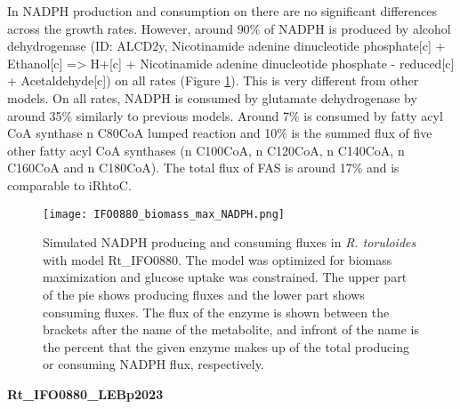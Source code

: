 In NADPH production and consumption on there are no significant differences across the growth rates. However, around $90\%$ of NADPH is produced by alcohol dehydrogenase (ID: ALCD2y, Nicotinamide adenine dinucleotide phosphate[c] + Ethanol[c] => H+[c] + Nicotinamide adenine dinucleotide phosphate - reduced[c] + Acetaldehyde[c]) on all rates (Figure \ref{fig:IFO0880_biomass_max_NADPH_max}). This is very different from other models. 
On all rates, NADPH is consumed by glutamate dehydrogenase by around 35\% similarly to previous models. Around 7\% is consumed by fatty acyl CoA synthase n C80CoA lumped reaction and 10\% is the summed flux of five other fatty acyl CoA synthases (n C100CoA, n C120CoA, n C140CoA, n C160CoA and n C180CoA). The total flux of FAS is around 17\% and is comparable to iRhtoC.
\begin{figure}[H]
    \centering
    \texttt{[image: IFO0880\_biomass\_max\_NADPH.png]}
    \caption{Simulated NADPH producing and consuming fluxes in \textit{R. toruloides} with model Rt\_IFO0880. The model was optimized for biomass maximization 
    and glucose uptake was constrained. The upper part of the pie shows producing fluxes and the lower part shows consuming fluxes.
    The flux of the enzyme is shown between the brackets after the name of the metabolite, and infront of the name is the percent
    that the given enzyme makes up of the total producing or consuming NADPH flux, respectively.}
    \label{fig:IFO0880_biomass_max_NADPH_max}
\end{figure}



\textbf{Rt\_IFO0880\_LEBp2023}

